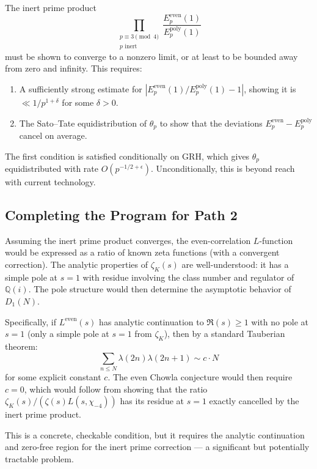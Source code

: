 \documentclass[11pt,a4paper]{article}
\theoremstyle{plain}
\theoremstyle{definition}
\newcommand{\QQ}{\mathbb{Q}}
\begin{document}
\begin{strategy}
The inert prime product
\begin{equation}
\label{eq:inert-product}
\prod_{\substack{p \equiv 3 \!\!\!\pmod{4} \\ p \text{ inert}}} \frac{E_p^{\mathrm{even}}(1)}{E_p^{\mathrm{poly}}(1)}
\end{equation}
must be shown to converge to a nonzero limit, or at least to be bounded away from zero and infinity. This requires:
\begin{enumerate}
\item A sufficiently strong estimate for $|E_p^{\mathrm{even}}(1) / E_p^{\mathrm{poly}}(1) - 1|$, showing it is $\ll 1/p^{1+\delta}$ for some $\delta > 0$.
\item The Sato--Tate equidistribution of $\theta_p$ to show that the deviations $E_p^{\mathrm{even}} - E_p^{\mathrm{poly}}$ cancel on average.
\end{enumerate}
The first condition is satisfied conditionally on GRH, which gives $\theta_p$ equidistributed with rate $O(p^{-1/2+\epsilon})$. Unconditionally, this is beyond reach with current technology.
\end{strategy}

\subsection{Completing the Program for Path 2}

Assuming the inert prime product converges, the even-correlation $L$-function would be expressed as a ratio of known zeta functions (with a convergent correction). The analytic properties of $\zeta_K(s)$ are well-understood: it has a simple pole at $s = 1$ with residue involving the class number and regulator of $\QQ(i)$. The pole structure would then determine the asymptotic behavior of $D_1(N)$.

Specifically, if $L^{\mathrm{even}}(s)$ has analytic continuation to $\Re(s) \geq 1$ with no pole at $s = 1$ (only a simple pole at $s = 1$ from $\zeta_K$), then by a standard Tauberian theorem:
\[
\sum_{n \leq N} \lambda(2n)\lambda(2n+1) \sim c \cdot N
\]
for some explicit constant $c$. The even Chowla conjecture would then require $c = 0$, which would follow from showing that the ratio $\zeta_K(s) / (\zeta(s) L(s, \chi_{-4}))$ has its residue at $s = 1$ exactly cancelled by the inert prime product.

This is a concrete, checkable condition, but it requires the analytic continuation and zero-free region for the inert prime correction --- a significant but potentially tractable problem.
\end{document}
